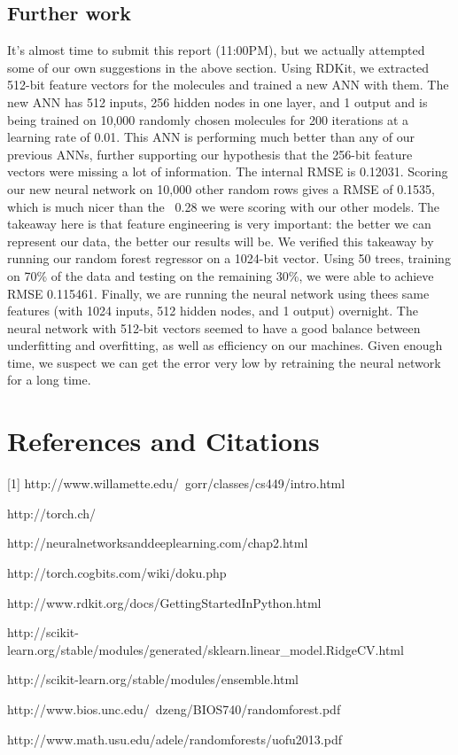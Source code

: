 \documentclass{article}
\begin{document}
\subsection{Further work}
It's almost time to submit
this report (11:00PM), but we actually
attempted some of our own suggestions
in the above section.  Using RDKit, we
extracted 512-bit feature vectors for
the molecules and trained a new ANN with them.
The new ANN has 512 inputs, 256 hidden nodes
in one layer, and 1 output and is being
trained on 10,000 randomly chosen molecules
for 200 iterations at a learning rate of 0.01.
This ANN
is performing much better than any of our previous
ANNs, further supporting our hypothesis that the
256-bit feature vectors were missing a lot of information.
The internal RMSE is 0.12031. Scoring our
new neural network on 10,000 other random
rows gives a RMSE of 0.1535, which is much nicer
than the ~0.28 we were scoring with our other 
models.  The takeaway here is that feature
engineering is very important: the better we can 
represent our data, the better our results
will be. We verified this takeaway by running our random forest regressor on a 1024-bit vector. Using 50 trees, training on 70\% of the data and testing on the remaining 30\%, we were able to achieve RMSE 0.115461. Finally, we are running the neural network using thees same features (with 1024 inputs, 512 hidden nodes, and 1 output) overnight.  The neural network with 512-bit vectors seemed
to have a good balance between underfitting
and overfitting, as well as efficiency
on our machines.  Given enough time,
we suspect we can get the error very low
by retraining the neural network for a long time.

\section{References and Citations}


  [1] http://www.willamette.edu/~gorr/classes/cs449/intro.html
  
  \noindent [2] http://torch.ch/
  
  \noindent [3] http://neuralnetworksanddeeplearning.com/chap2.html
  
  \noindent [4] http://torch.cogbits.com/wiki/doku.php
  
  \noindent [5] http://www.rdkit.org/docs/GettingStartedInPython.html
  
  \noindent [6] http://scikit-learn.org/stable/modules/generated/sklearn.linear\_model.RidgeCV.html
  
  \noindent [7] http://scikit-learn.org/stable/modules/ensemble.html
  
  \noindent [8] http://www.bios.unc.edu/~dzeng/BIOS740/randomforest.pdf
  
  \noindent [9] http://www.math.usu.edu/adele/randomforests/uofu2013.pdf
\end{document}
